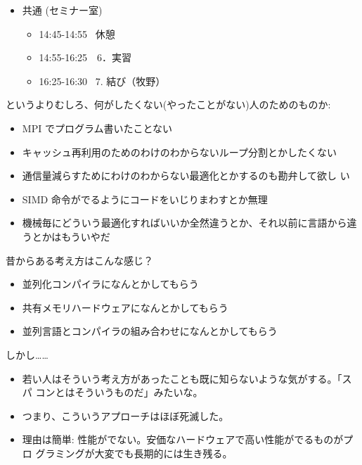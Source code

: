 \documentclass[12pt,dvipdfmx]{article}
\begin{document}

\begin{itemize}
\item 共通 (セミナー室)
\begin{itemize}
\item 14:45-14:55  休憩
\item 14:55-16:25　6．実習
\item 16:25-16:30  7. 結び（牧野）
\end{itemize}

\end{itemize}



というよりむしろ、何がしたくない(やったことがない)人のためのものか:

\begin{itemize}

\item MPI でプログラム書いたことない

\item キャッシュ再利用のためのわけのわからないループ分割とかしたくない

\item 通信量減らすためにわけのわからない最適化とかするのも勘弁して欲し
い

\item SIMD 命令がでるようにコードをいじりまわすとか無理

\item 機械毎にどういう最適化すればいいか全然違うとか、それ以前に言語から違うとかはもういやだ

\end{itemize}


昔からある考え方はこんな感じ？

\begin{itemize}

\item 並列化コンパイラになんとかしてもらう

\item 共有メモリハードウェアになんとかしてもらう

\item 並列言語とコンパイラの組み合わせになんとかしてもらう

\end{itemize}

しかし……
\begin{itemize}

\item 若い人はそういう考え方があったことも既に知らないような気がする。「スパ
コンとはそういうものだ」みたいな。

\item つまり、こういうアプローチはほぼ死滅した。

\item 理由は簡単: 性能がでない。安価なハードウェアで高い性能がでるものがプロ
グラミングが大変でも長期的には生き残る。

\end{itemize}
\end{document}
